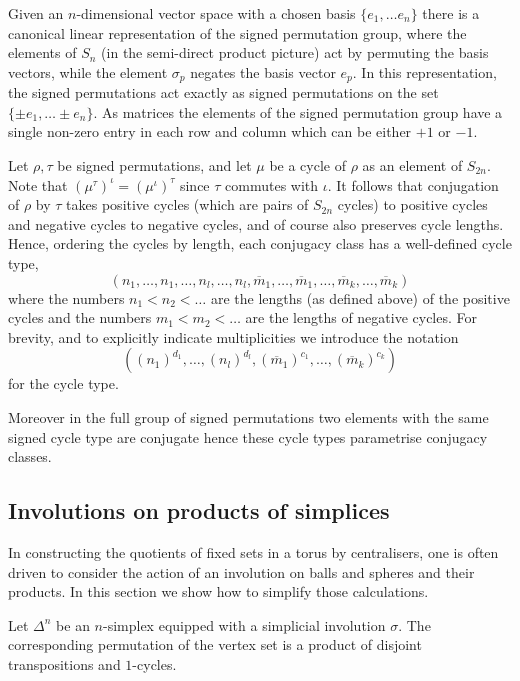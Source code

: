 \documentclass[11pt,a4paper]{article}
\def\mbar{\overline{m}}
\def\mbar{\overline{m}}
\begin{document}
Given an $n$-dimensional vector space with a chosen basis $\{e_1,\dots e_n\}$ there is a canonical linear representation of the signed permutation group, where the elements of $S_n$ (in the semi-direct product picture) act by permuting the basis vectors, while the element $\sigma_p$ negates the basis vector $e_p$.  In this representation, the signed permutations act exactly as signed permutations on the set $\{\pm e_1,\dots \pm e_n\}$. As matrices the elements of the signed permutation group have a single non-zero entry in each row and column which can be either $+1$ or $-1$.

Let $\rho, \tau$ be signed permutations, and let $\mu$ be a cycle of $\rho$ as an element of $S_{2n}$.  Note that $(\mu^\tau)^\iota=(\mu^\iota)^\tau$ since $\tau$ commutes with $\iota$. It follows that conjugation of $\rho$ by $\tau$ takes positive cycles (which are pairs of $S_{2n}$ cycles) to positive cycles and negative cycles to negative cycles, and of course also preserves cycle lengths.  Hence, ordering the cycles by length, each conjugacy class has a well-defined cycle type,
\[
(n_1,\dots,n_1,\dots,n_l,\dots,n_l,\mbar_1,\dots,\mbar_1,\dots, \mbar_k,\dots,\mbar_k)
\]
where the numbers $n_1<n_2<\dots$ are the lengths (as defined above) of the positive cycles and the numbers $m_1<m_2<\dots$ are the lengths of negative cycles.  For brevity, and to explicitly indicate multiplicities we introduce the notation
\[
((n_1)^{d_1},\dots, (n_l)^{d_l},(\mbar_1)^{c_1},\dots, (\mbar_k)^{c_k})
\]
for the cycle type.

Moreover in the full group of signed permutations two elements with the same signed cycle type are conjugate hence these cycle types parametrise conjugacy classes.





\subsection{Involutions on products of simplices}\label{involutions}

In constructing the quotients of fixed sets in a torus by centralisers, one is often driven to consider the action of an involution on balls and spheres and their products. In this section we show how to simplify those calculations.


Let $\Delta^n$ be an $n$-simplex equipped with a simplicial involution $\sigma$.  The corresponding permutation of the vertex set is a product of disjoint transpositions and $1$-cycles.
\end{document}
